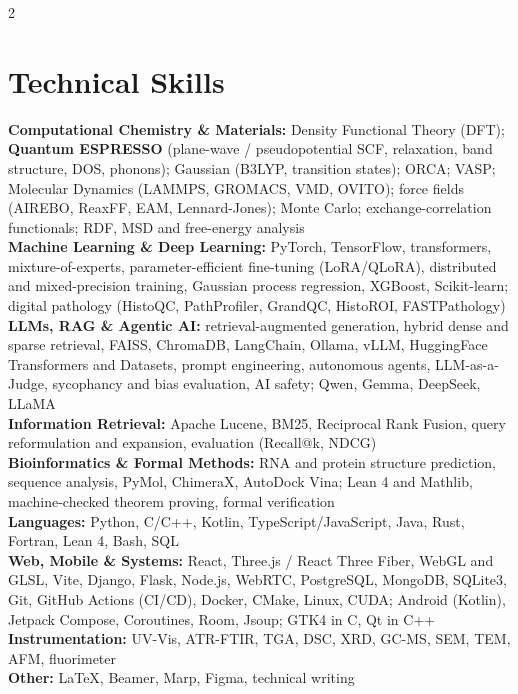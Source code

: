 \documentclass[a4paper,10.5pt]{extarticle}
\begin{document}
\newpage
{}
\begin{paracol}{2}

\section{Technical Skills}
{\small
\textbf{Computational Chemistry \& Materials:} Density Functional Theory (DFT); \textbf{Quantum ESPRESSO} (plane-wave / pseudopotential SCF, relaxation, band structure, DOS, phonons); Gaussian (B3LYP, transition states); ORCA; VASP; Molecular Dynamics (LAMMPS, GROMACS, VMD, OVITO); force fields (AIREBO, ReaxFF, EAM, Lennard-Jones); Monte Carlo; exchange-correlation functionals; RDF, MSD and free-energy analysis\\[2.5pt]
\textbf{Machine Learning \& Deep Learning:} PyTorch, TensorFlow, transformers, mixture-of-experts, parameter-efficient fine-tuning (LoRA/QLoRA), distributed and mixed-precision training, Gaussian process regression, XGBoost, Scikit-learn; digital pathology (HistoQC, PathProfiler, GrandQC, HistoROI, FASTPathology)\\[2.5pt]
\textbf{LLMs, RAG \& Agentic AI:} retrieval-augmented generation, hybrid dense and sparse retrieval, FAISS, ChromaDB, LangChain, Ollama, vLLM, HuggingFace Transformers and Datasets, prompt engineering, autonomous agents, LLM-as-a-Judge, sycophancy and bias evaluation, AI safety; Qwen, Gemma, DeepSeek, LLaMA\\[2.5pt]
\textbf{Information Retrieval:} Apache Lucene, BM25, Reciprocal Rank Fusion, query reformulation and expansion, evaluation (Recall@k, NDCG)\\[2.5pt]
\textbf{Bioinformatics \& Formal Methods:} RNA and protein structure prediction, sequence analysis, PyMol, ChimeraX, AutoDock Vina; Lean 4 and Mathlib, machine-checked theorem proving, formal verification\\[2.5pt]
\textbf{Languages:} Python, C/C++, Kotlin, TypeScript/JavaScript, Java, Rust, Fortran, Lean 4, Bash, SQL\\[2.5pt]
\textbf{Web, Mobile \& Systems:} React, Three.js / React Three Fiber, WebGL and GLSL, Vite, Django, Flask, Node.js, WebRTC, PostgreSQL, MongoDB, SQLite3, Git, GitHub Actions (CI/CD), Docker, CMake, Linux, CUDA; Android (Kotlin), Jetpack Compose, Coroutines, Room, Jsoup; GTK4 in C, Qt in C++\\[2.5pt]
\textbf{Instrumentation:} UV-Vis, ATR-FTIR, TGA, DSC, XRD, GC-MS, SEM, TEM, AFM, fluorimeter\\[2.5pt]
\textbf{Other:} \LaTeX, Beamer, Marp, Figma, technical writing
}


\end{paracol}
\end{document}
